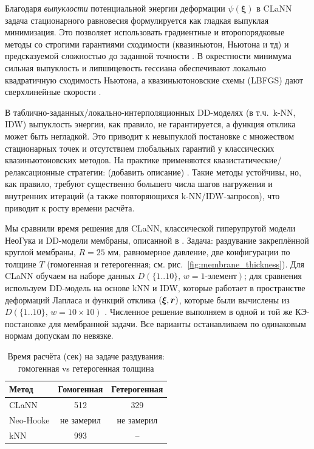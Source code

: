   Благодаря \emph{выпуклости} потенциальной энергии деформации $\psi(\boldsymbol\xi)$ в CLaNN задача стационарного равновесия формулируется
  как гладкая выпуклая минимизация. Это позволяет использовать градиентные и второпорядковые методы со строгими гарантиями сходимости
  (квазиньютон, Ньютона и тд)
  и предсказуемой сложностью до заданной точности \cite{BoydVandenberghe2004,Nesterov2004,NocedalWright2006,ConnGouldToint2000}.
  В окрестности минимума сильная выпуклость и липшицевость гессиана обеспечивают локально квадратичную сходимость Ньютона,
  а квазиньютоновские схемы (L\textendash BFGS) дают сверхлинейные скорости \cite{NocedalWright2006}.

  В таблично-заданных/локально-интерполяционных DD-моделях (в т.ч.\ k-NN, IDW) выпуклость энергии, как правило, не гарантируется,
  а функция отклика может быть негладкой. Это приводит к невыпуклой постановке с множеством стационарных точек и
  отсутствием глобальных гарантий у классических квазиньютоновских методов. На практике применяются
  квазистатические/релаксационные стратегии: (добавить описание) \cite{KirchdoerferOrtiz2016,KirchdoerferOrtiz2017}.
  Такие методы устойчивы, но, как правило, требуют существенно большего числа шагов нагружения и внутренних итераций
  (а также повторяющихся k-NN/IDW-запросов), что приводит к росту времени расчёта.

  Мы сравнили время решения для CLaNN, классической гиперупругой модели Нео\textendash Гука и DD-модели мембраны, описанной в \cite{xi2023}.
  Задача: раздувание закреплённой круглой мембраны, $R{=}25$ мм, равномерное давление, две конфигурации по толщине $T$ (гомогенная и гетерогенная; см. рис.~\ref{fig:membrane_thickness}).
  Для CLaNN обучаем на наборе данных $D(\{1..10\},\,w{=}\text{1-элемент})$; для сравнения используем DD-модель на основе 
  kNN и IDW, которые работает в пространстве деформаций Лапласа и функций отклика $(\boldsymbol{\xi}, \boldsymbol{r})$, 
  которые были вычислены из $D(\{1..10\},\,w{=}\text{10}\times\text{10})$ \cite{xi2023}.
  Численное решение выполняем в одной и той же КЭ-постановке для мембранной задачи. 
  Все варианты останавливаем по одинаковым нормам допускам по невязке.

\begin{table}[htbp]
\centering
\caption{Время расчёта (сек) на задаче раздувания: гомогенная vs гетерогенная толщина}
\label{tab:experiments_summary}
\begin{tabular}{|l|c|c|}
\hline
\textbf{Метод} & \textbf{Гомогенная} & \textbf{Гетерогенная} \\
\hline
CLaNN & 512 & 329  \\
\hline
Neo-Hooke & не замерил & не замерил\\
\hline
kNN & 993 & -- \\
\hline
\end{tabular}
\end{table}

